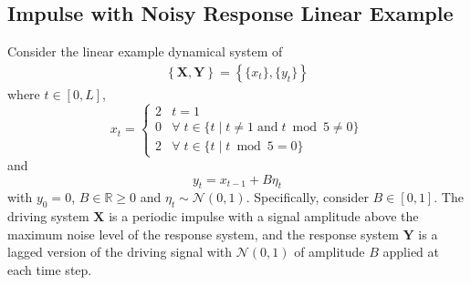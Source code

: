 \documentclass[twocolumn,aps,pre,groupedaddress]{revtex4-1}
\begin{document}
\subsection{Impulse with Noisy Response Linear Example}
\label{sec:IR}
Consider the linear example dynamical system of
\begin{eqnarray}
\label{eqn:IReqn}
\left\{\mathbf{X},\mathbf{Y}\right\} = \left\{\{x_t\},\{y_t\}\right\}
\end{eqnarray}
where $t\in[0,L]$,
\begin{equation*}
x_t = \left\{
  \begin{array}{lr}
    2 & t = 1\\
    0 & \forall\; t\in\{t\;|\;t\neq 1 \;\mathrm{and}\; t\bmod 5 \neq 0\}\\
    2 & \forall\; t\in\{t\;|\;t\bmod 5 = 0\}
  \end{array}
\right.
\end{equation*}
and
\begin{equation*}
y_t = x_{t-1} + B\eta_t
\end{equation*}
with $y_0 = 0$, $B\in\mathbb{R}\ge 0$ and $\eta_t\sim\mathcal{N}\left(0,1\right)$.  Specifically, consider $B\in[0,1]$.  The driving system $\mathbf{X}$ is a periodic impulse with a signal amplitude above the maximum noise level of the response system, and the response system $\mathbf{Y}$ is a lagged version of the driving signal with $\mathcal{N}\left(0,1\right)$ of amplitude $B$ applied at each time step.  
\end{document}
